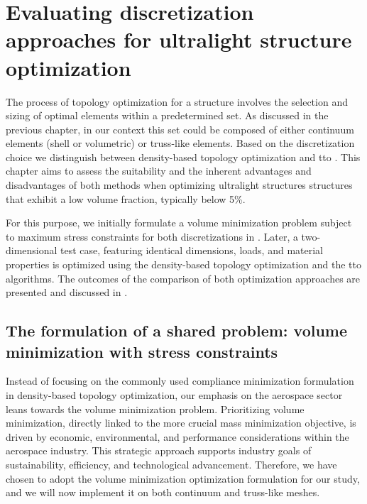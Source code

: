 \setchapterpreamble[u]{\margintoc}
\glsresetall %
\chapter{Evaluating discretization approaches for ultralight structure optimization} 
\label{chap:03}
The process of topology optimization for a structure involves the selection and sizing of optimal elements within a predetermined set. As discussed in the previous chapter, in our context this set could be composed of either continuum elements (shell or volumetric) or truss-like elements. Based on the discretization choice we distinguish between density-based topology optimization and \gls{tto} . This chapter aims to assess the suitability and the inherent advantages and disadvantages of both methods when optimizing ultralight structures \ie structures that exhibit a low volume fraction, typically below 5\%. 

For this purpose, we initially formulate a volume minimization problem subject to maximum stress constraints for both discretizations in . Later, a two-dimensional test case, featuring identical dimensions, loads, and material properties is optimized using the density-based topology optimization and the \gls{tto} algorithms. The outcomes of the comparison of both optimization approaches are presented and discussed in . 

\section{The formulation of a shared problem: volume minimization with stress constraints} \label{sec:03_common_prob}
Instead of focusing on the commonly used compliance minimization formulation in density-based topology optimization, our emphasis on the aerospace sector leans towards the volume minimization problem. Prioritizing volume minimization, directly linked to the more crucial mass minimization objective, is driven by economic, environmental, and performance considerations within the aerospace industry. This strategic approach supports industry goals of sustainability, efficiency, and technological advancement. Therefore, we have chosen to adopt the volume minimization optimization formulation for our study, and we will now implement it on both continuum and truss-like meshes.

